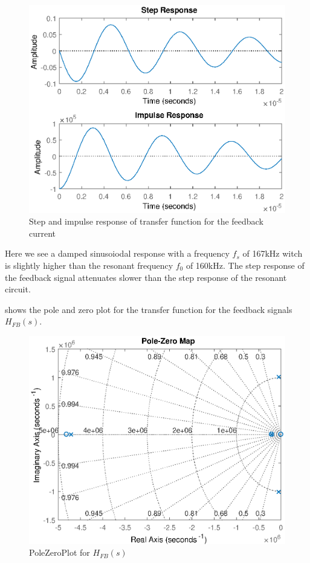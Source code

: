 \begin{figure}[H]
    \centering
    \includegraphics[width=\textwidth]{img/FeedBackResponse.eps}
    \caption{Step and impulse response of transfer function for the feedback current}
    \label{fig:fb_step}
\end{figure}

Here we see a damped sinusoiodal response with a frequency $f_s$ of 167kHz witch is slightly higher than the resonant frequency $f_0$ of 160kHz. The step response of the feedback signal attenuates slower than the step response of the resonant circuit.

 shows the pole and zero plot for the transfer function for the feedback signals $H_{FB}(s)$.

\begin{figure}[H]
    \centering
    \includegraphics[width=\textwidth]{img/FeedBackPoleZeroPlot.eps}
    \caption{PoleZeroPlot for $H_{FB}(s)$}
    \label{fig:fbpolezero}
\end{figure}

